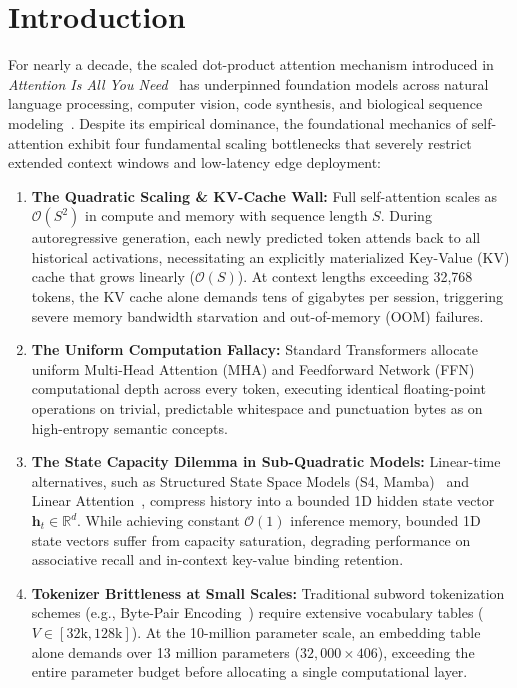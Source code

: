 \documentclass[10pt,twocolumn,letterpaper]{article}
\begin{document}
\section{Introduction}
\label{sec:intro}

For nearly a decade, the scaled dot-product attention mechanism introduced in \textit{Attention Is All You Need}~\cite{vaswani2017attention} has underpinned foundation models across natural language processing, computer vision, code synthesis, and biological sequence modeling~\cite{radford2019gpt2,brown2020gpt3,touvron2023llama}. Despite its empirical dominance, the foundational mechanics of self-attention exhibit four fundamental scaling bottlenecks that severely restrict extended context windows and low-latency edge deployment:

\begin{enumerate}[leftmargin=*]
    \item \textbf{The Quadratic Scaling \& KV-Cache Wall:} Full self-attention scales as $\mathcal{O}(S^2)$ in compute and memory with sequence length $S$. During autoregressive generation, each newly predicted token attends back to all historical activations, necessitating an explicitly materialized Key-Value (KV) cache that grows linearly ($\mathcal{O}(S)$). At context lengths exceeding 32,768 tokens, the KV cache alone demands tens of gigabytes per session, triggering severe memory bandwidth starvation and out-of-memory (OOM) failures.
    \item \textbf{The Uniform Computation Fallacy:} Standard Transformers allocate uniform Multi-Head Attention (MHA) and Feedforward Network (FFN) computational depth across every token, executing identical floating-point operations on trivial, predictable whitespace and punctuation bytes as on high-entropy semantic concepts.
    \item \textbf{The State Capacity Dilemma in Sub-Quadratic Models:} Linear-time alternatives, such as Structured State Space Models (S4, Mamba)~\cite{gu2021s4,gu2023mamba} and Linear Attention~\cite{katharopoulos2020transformers}, compress history into a bounded 1D hidden state vector $\mathbf{h}_t \in \mathbb{R}^d$. While achieving constant $\mathcal{O}(1)$ inference memory, bounded 1D state vectors suffer from capacity saturation, degrading performance on associative recall and in-context key-value binding retention.
    \item \textbf{Tokenizer Brittleness at Small Scales:} Traditional subword tokenization schemes (e.g., Byte-Pair Encoding~\cite{sennrich2016bpe}) require extensive vocabulary tables ($V \in [32\text{k}, 128\text{k}]$). At the 10-million parameter scale, an embedding table alone demands over 13 million parameters ($32,000 \times 406$), exceeding the entire parameter budget before allocating a single computational layer.
\end{enumerate}
\end{document}
